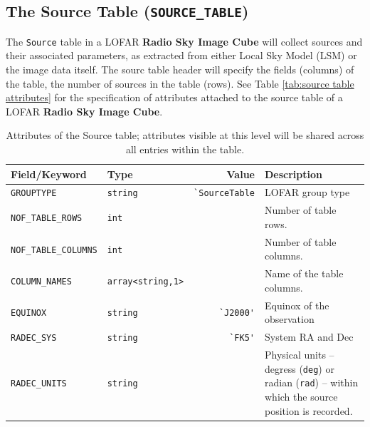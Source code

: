 \documentclass[a4paper,10pt,bibtotoc]{scrartcl}
\begin{document}

\subsection{The Source Table ({\tt SOURCE\_TABLE})}
\label{sec:source table}

The \texttt{Source} table in a LOFAR \textbf{Radio Sky Image Cube}
will collect sources and their associated parameters, as extracted
from either Local Sky Model (LSM) or the image data itself. The sourc
table header will specify the fields (columns) of the table, the
number of sources in the table (rows). See Table \ref{tab:source table
  attributes} for the specification of attributes attached to the
source table of a LOFAR \textbf{Radio Sky Image Cube}.

\begin{table}[htbp]
  \centering
  \begin{tabular}{|llrp{7cm}|}
    \hline
    \sc Field/Keyword & \sc Type & \sc Value & \sc Description \\
    \hline \hline
    \small\verb|GROUPTYPE|         &  \small\verb|string|
                                   & \verb|`SourceTable|
                                   & LOFAR group type \\
    \small\verb|NOF_TABLE_ROWS|    & \small\verb|int|
                                   &
                                   & Number of table rows. \\
    \small\verb|NOF_TABLE_COLUMNS| & \small\verb|int|
                                   &
                                   & Number of table columns. \\
    \small\verb|COLUMN_NAMES|      & \small{\verb|array<string,1>|}
                                   &
                                   & Name of the table columns. \\
    \small \verb|EQUINOX|          & \small\verb|string|
                                   & \verb|`J2000'|
                                   & Equinox of the observation \\
    \small\verb|RADEC_SYS|         & \small\verb|string|
                                   & \verb|`FK5'|
                                   & System RA and Dec \\
    \small\verb|RADEC_UNITS|       & \small\verb|string|
                                   &
                                   & Physical units -- degress
                                   (\texttt{deg}) or radian (\texttt{rad})
                                   -- within which the source position is
                                   recorded. \\
  \hline
  \end{tabular}
  \caption{Attributes of the Source table; attributes visible at this
    level will be shared across all entries within the table.}
  \label{tab:source table attributes}
\end{table}
\end{document}
